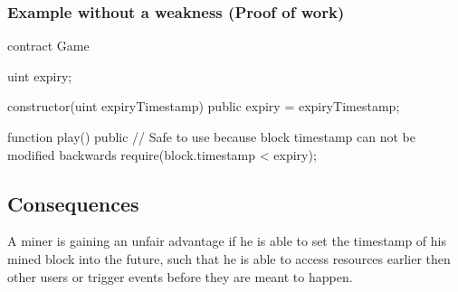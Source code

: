 \subsubsection{Example without a weakness (Proof of work)}
\begin{solidity}
contract Game {
    uint expiry;

    constructor(uint expiryTimestamp) public {
        expiry = expiryTimestamp;
    }

    function play() public {
        // Safe to use because block timestamp can not be modified backwards
        require(block.timestamp < expiry);
    }
}
\end{solidity}
    
\subsection{Consequences}
A miner is gaining an unfair advantage if he is able to set the timestamp
of his mined block into the future, such that he is able to access
resources earlier then other users or trigger events before they are meant to happen.

